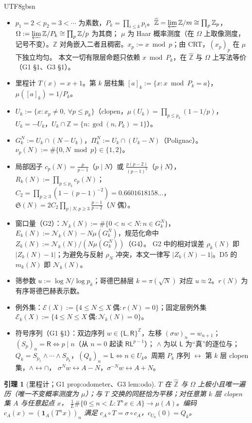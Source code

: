 \documentclass[11pt,a4paper]{article}
\newcommand{\Zhat}{\widehat{\mathbb Z}}
\newcommand{\Haar}{\mu}
\newcommand{\Sing}{\mathfrak S}
\newcommand{\Lsym}{\ensuremath{\mathsf{L}}}
\newcommand{\Rsym}{\ensuremath{\mathsf{R}}}
\newcommand{\status}[1]{\par\noindent\fbox{\textbf{状态：#1}}\par\smallskip}
\newcommand{\Cnt}{\mathcal N}          %
\newcommand{\Om}{\Omega}               %
\newcommand{\cyl}[2]{[#1]_{#2}}        %
\newcommand{\Exc}{\mathcal E}          %
\theoremstyle{plain}
\newtheorem{lem}{引理}[section]
\theoremstyle{definition}
\begin{document}
\begin{CJK}{UTF8}{gbsn}
\begin{itemize}[leftmargin=*]
\item $p_1=2<p_2=3<\cdots$ 为素数，$P_k=\prod_{i\le k}p_i$。$\Zhat=\varprojlim\mathbb Z/m\cong\prod_p\mathbb Z_p$，$\Om:=\varprojlim\mathbb Z/P_k\cong\prod_p\mathbb Z/p$ 为其商；
$\Haar$ 为 Haar 概率测度（在 $\Om$ 上取像测度，记号不变）。$\mathbb Z$ 对角嵌入二者且稠密。$x_p:=x\bmod p$；由 CRT，$(x_p)_p$ 在 $\Haar$ 下独立均匀。
本文一切有限层命题只依赖 $x\bmod P_k$，在 $\Zhat$ 与 $\Om$ 上写法等价（G1 \S1、G3 \S1）。
\item 里程计 $T(x)=x+1$。第 $k$ 层柱集 $\cyl ak:=\{x:x\bmod P_k=a\}$，$\Haar(\cyl ak)=1/P_k$。
\item $U_k:=\{x:x_p\ne0,\ \forall p\le p_k\}$（clopen，$\Haar(U_k)=\prod_{p\le p_k}(1-1/p)$，$U_k=-U_k$，$U_k\cap\mathbb Z=\{n:\gcd(n,P_k)=1\}$）。
\item $G_k^N:=U_k\cap(N-U_k)$，$\Pi_k^N:=U_k\cap(U_k-N)$（Polignac）。$\nu_p(N):=\#\{0,N\bmod p\}\in\{1,2\}$。
\item 局部因子 $c_p(N)=\frac{p}{p-1}$（$p\mid N$）或 $\frac{p(p-2)}{(p-1)^2}$（$p\nmid N$），$R_k(N):=\prod_{p\le p_k}c_p(N)$；
$C_2=\prod_{p\ge3}(1-(p-1)^{-2})=0.6601618158\ldots$，$\Sing(N)=2C_2\prod_{p\mid N,p\ge3}\frac{p-1}{p-2}$（$N$ 偶）。
\item 窗口量（G2）：$\Cnt_k(N):=\#\{0<n<N:n\in G_k^N\}$，$E_k(N):=\Cnt_k(N)-N\Haar(G_k^N)$，规范化命中 $Z_k(N):=\Cnt_k(N)/(N\Haar(G_k^N))$（G4）。
G2 中的相对误差 $\rho_k(N)$ 即 $|Z_k(N)-1|$；为避免与反射 $\rho_N$ 冲突，本文一律写 $|Z_k(N)-1|$。D5 的 $m_k(N)$ 即 $\Cnt_k(N)$。
\item 筛参数 $u:=\log N/\log p_k$；哥德巴赫层 $k=\pi(\sqrt N)$ 对应 $u\approx2$。$r(N)$ 为有序哥德巴赫表示数。
\item 例外集：$\Exc(X):=\{4\le N\le X\ \text{偶}:r(N)=0\}$；固定层例外集 $\Exc_k(X):=\{4\le N\le X\ \text{偶}:\Cnt_k(N)=0\}$。
\item 符号序列（G1 \S1）：双边序列 $w\in\{\Lsym,\Rsym\}^{\mathbb Z}$，左移 $(\sigma w)_n=w_{n+1}$；$(S_p)_n=\Rsym\iff p\mid n$（从 $n=0$ 起读 $\Rsym\Lsym^{p-1}$）；
$\wedge$ 为以 $\Lsym$ 为“真”的逐位与；$Q_k=S_{p_1}\wedge\cdots\wedge S_{p_k}$，$(Q_k)_n=\Lsym\iff n\in U_k$。周期 $P_k$ 序列 $\leftrightarrow$ 第 $k$ 层 clopen 集，$\wedge\leftrightarrow\cap$，
$\sigma^N w\leftrightarrow A-N$，$\sigma^{-N}w\leftrightarrow A+N$。
\end{itemize}

\begin{lem}[里程计；G1 prop:odometer、G3 lem:odo]\label{paper:lem:odo}
$T$ 在 $\Zhat$ 与 $\Om$ 上极小且唯一遍历（唯一不变概率测度为 $\Haar$）；与 $T$ 交换的同胚恰为平移；对任意第 $k$ 层 clopen 集 $A$ 与任意起点 $x$，
$\frac1L\#\{0\le n<L:T^nx\in A\}\to\Haar(A)$。编码 $c_A(x)=(\mathbf 1_A(T^nx))_n$ 满足 $c_A\circ T=\sigma\circ c_A$，$c_{U_k}(0)=Q_k$。
\end{lem}
\status{已证（标准事实；证明见 G1、G3）}


\end{CJK}
\end{document}
